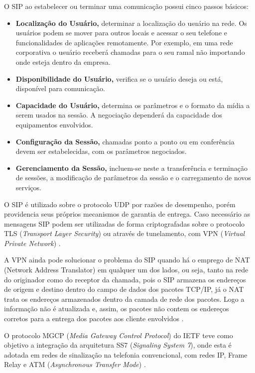 O SIP ao estabelecer ou terminar uma comunicação possui cinco passos básicos:
\begin{itemize}
  \item \textbf{Localização do Usuário,} determinar a localização do usuário na rede. Os usuários podem se mover para outros locais e acessar o seu telefone e funcionalidades de aplicações remotamente. Por exemplo, em uma rede corporativa o usuário receberá chamadas para o seu ramal não importando onde esteja dentro da empresa.
  \item \textbf{Disponibilidade do Usuário,} verifica se o usuário deseja ou está, disponível para comunicação.
  \item \textbf{Capacidade do Usuário,} determina os parâmetros e o formato da mídia a serem usados na sessão. A negociação dependerá da capacidade dos equipamentos envolvidos.
  \item \textbf{Configuração da Sessão,} chamadas ponto a ponto ou em conferência devem ser estabelecidas, com os parâmetros negociados.
  \item \textbf{Gerenciamento da Sessão,} incluem-se neste a transferência e terminação de sessões, a modificação de parâmetros da sessão e o carregamento de novos serviços.
\end{itemize}

O SIP é utilizado sobre o protocolo UDP por razões de desempenho, porém providencia seus próprios mecanismos de garantia de entrega. Caso necessário as mensagens SIP podem ser utilizadas de forma criptografadas sobre o protocolo TLS (\textit{Transport Layer Security}) ou através de tunelamento, com VPN (\textit{Virtual Private Network}) \cite{davidson2008}.

A VPN ainda pode solucionar o problema do SIP quando há o emprego de NAT (Network Address Translator) em qualquer um dos lados, ou seja, tanto na rede do originador como do receptor da chamada, pois o SIP armazena os endereços de origem e destino dentro do campo de dados dos pacotes TCP/IP, já o NAT trata os endereços armazenados dentro da camada de rede dos pacotes. Logo a informação não é atualizada e, assim, os pacotes não contem os endereços corretos para a entrega dos pacotes aos cliente envolvidos \cite{alexandrekeller2014}.

O protocolo MGCP (\textit{Media Gateway Control Protocol}) do IETF teve como objetivo a integração da arquitetura SS7 (\textit{Signaling System 7}), onde esta é adotada em redes de sinalização na telefonia convencional, com redes IP, Frame Relay e ATM (\textit{Asynchronous Transfer Mode}) \cite{theodorewallingford2005}.

